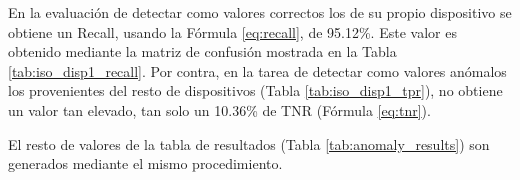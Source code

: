 En la evaluación de detectar como valores correctos los de su propio dispositivo se obtiene un Recall, usando la Fórmula \ref{eq:recall}, de 95.12\%. Este valor es obtenido mediante la matriz de confusión mostrada en la Tabla \ref{tab:iso_disp1_recall}. Por contra, en la tarea de detectar como valores anómalos los provenientes del resto de dispositivos (Tabla \ref{tab:iso_disp1_tpr}), no obtiene un valor tan elevado, tan solo un 10.36\% de TNR (Fórmula \ref{eq:tnr}).

\begin{table}
    \centering
     \qquad
    \caption{Matrices de confusión del Disp. 1 con el modelo de Isolation Forest}
    \label{tab:ex_unsupervised_results}
\end{table}

El resto de valores de la tabla de resultados (Tabla \ref{tab:anomaly_results}) son generados mediante el mismo procedimiento.

